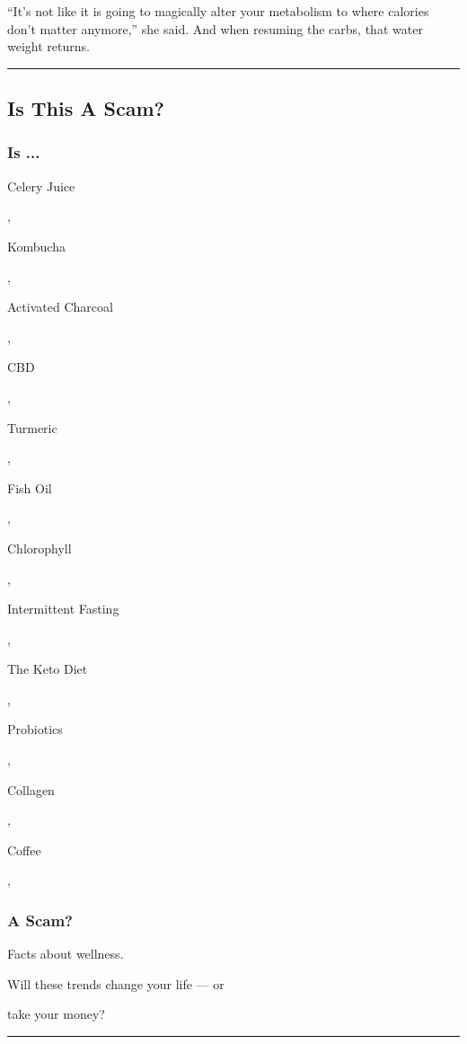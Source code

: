 ``It's not like it is going to magically alter your metabolism to where
calories don't matter anymore,'' she said. And when resuming the carbs,
that water weight returns.

\begin{center}\rule{0.5\linewidth}{\linethickness}\end{center}

\hypertarget{is-this-a-scam}{%
\subsection{Is This A Scam?}\label{is-this-a-scam}}

\hypertarget{is-}{%
\subsubsection{Is ...}\label{is-}}

Celery Juice

,

Kombucha

,

Activated Charcoal

,

CBD

,

Turmeric

,

Fish Oil

,

Chlorophyll

,

Intermittent Fasting

,

The Keto Diet

,

Probiotics

,

Collagen

,

Coffee

,

\hypertarget{a-scam}{%
\subsubsection{A Scam?}\label{a-scam}}

Facts about wellness.

Will these trends change your life --- or

take your money?

\begin{center}\rule{0.5\linewidth}{\linethickness}\end{center}

